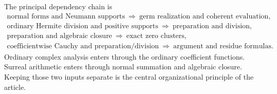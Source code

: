 \documentclass[11pt,letterpaper]{article}
\numberwithin{equation}{section}
\theoremstyle{definition}
\theoremstyle{remark}
\begin{document}
The principal dependency chain is
\[
 \begin{gathered}
 \text{normal forms and Neumann supports}
 \ \Longrightarrow\ \text{germ realization and coherent evaluation},\\
 \text{ordinary Hermite division and positive supports}
 \ \Longrightarrow\ \text{preparation and division},\\
 \text{preparation and algebraic closure}
 \ \Longrightarrow\ \text{exact zero clusters},\\
 \text{coefficientwise Cauchy and preparation/division}
 \ \Longrightarrow\ \text{argument and residue formulas}.
 \end{gathered}
\]
Ordinary complex analysis enters through the ordinary coefficient
functions. Surreal arithmetic enters through normal summation and
algebraic closure. Keeping those two inputs separate is the central
organizational principle of the article.
\end{document}
